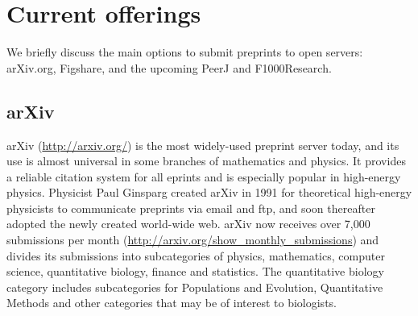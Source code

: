 \documentclass[letterpaper,twocolumn,superscriptaddress,showkeys]{revtex4-1}
\begin{document}


\section{Current offerings}

We briefly discuss the main options to submit preprints to open servers:
arXiv.org, Figshare, and the upcoming PeerJ and F1000Research.

\subsection{arXiv}

arXiv (\url{http://arxiv.org/}) is the most widely-used preprint server today,
and its use is almost universal in some branches of mathematics and physics.  It
provides a reliable citation system for all eprints and is especially popular in
high-energy physics. Physicist Paul Ginsparg created arXiv in 1991 for
theoretical high-energy physicists to communicate preprints via email and ftp,
and soon thereafter adopted the newly created world-wide
web\cite{jackson2002preprints}.  arXiv now receives over 7,000 submissions per
month (\url{http://arxiv.org/show_monthly_submissions}) and divides its
submissions into subcategories of physics, mathematics, computer science,
quantitative biology, finance and statistics.  The quantitative biology category
includes subcategories for Populations and Evolution, Quantitative Methods and
other categories that may be of interest to biologists.
\end{document}
